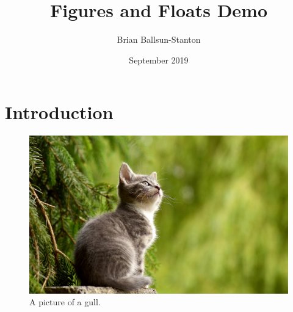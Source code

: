 \documentclass{article}
\title{Figures and Floats Demo}
\author{Brian Ballsun-Stanton}
\date{September 2019}
\begin{document}
\maketitle

\section{Introduction}

\begin{figure}
  \caption{A picture of a gull.}
  \centering
    \includegraphics[width=.5\textwidth]{cat.jpg}
\end{figure}

\lipsum[1-5]
\end{document}
